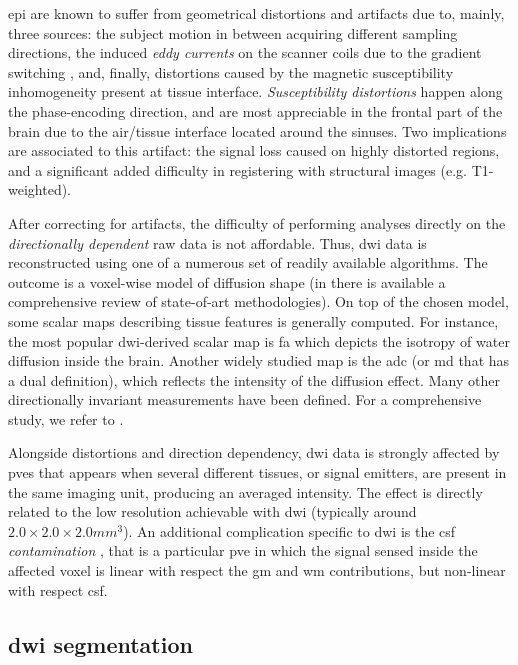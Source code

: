 \Gls{epi} are known to suffer from geometrical distortions and artifacts
due to, mainly, three sources: the subject motion in between acquiring 
different sampling directions, the induced \emph{eddy currents} on the scanner 
coils due to the gradient switching \citep{obrien_3d_2013}, and, finally, 
distortions caused by the magnetic susceptibility inhomogeneity
present at tissue interface. \emph{Susceptibility distortions} happen along the 
phase-encoding direction, and are most appreciable in the frontal part of 
the brain due to the air/tissue interface located around the sinuses.
Two implications are associated to this artifact: the signal loss caused on
highly distorted regions, and a significant added difficulty in 
registering with structural images (e.g. T1-weighted).

After correcting for artifacts, the difficulty of performing analyses directly
on the \emph{directionally dependent} raw data is not affordable. Thus, 
\gls{dwi} data is reconstructed using one of a numerous set of readily 
available algorithms. The outcome is a voxel-wise model of diffusion shape 
(in \citep{daducci_isbi2013_2013}  there is available a comprehensive review of 
state-of-art methodologies). On top of the
chosen model, some scalar maps describing tissue features is generally
computed. For instance, the most popular \gls{dwi}-derived scalar map 
is \gls{fa} which depicts the isotropy of water diffusion inside the brain.
Another widely studied map is the \gls{adc} (or \gls{md} that has a dual definition),
which reflects the intensity of the diffusion effect. Many other
directionally invariant measurements have been defined. For a comprehensive study, 
we refer to \citep{ennis_orthogonal_2006}.

Alongside distortions and direction dependency, \gls{dwi} data is strongly 
affected by \glspl{pve} \citep{alexander_analysis_2001} that appears when
several different tissues, or signal 
emitters, are present in the same imaging unit, producing an averaged intensity. 
The effect is directly related to the low resolution achievable with \gls{dwi} 
(typically around $2.0\times2.0\times2.0mm^3$). An additional complication specific to
\gls{dwi} is the \gls{csf} \emph{contamination} \citep{metzler-baddeley_how_2012},
that is a particular \gls{pve} in which the signal sensed inside the affected voxel is 
linear with respect the \gls{gm} and \gls{wm} contributions, but non-linear with
respect \gls{csf}.


\subsection{\Gls{dwi} segmentation}
\label{sec:dwi_segmentation}

